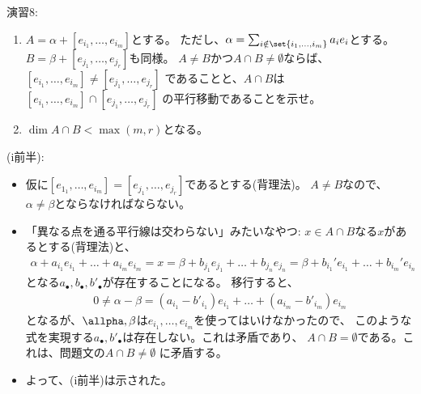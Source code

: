 \begin{framed}
  演習8:
  \begin{enumerate}[label=(\alph*)]
    \item $A=\alpha + [e_{i_1},\dots, e_{i_m}]$とする。
    ただし、$\alpha = \sum_{i\notin \set{i_1,\dots,i_m}}a_i e_i$とする。
    $B=\beta + [e_{j_1},\dots,e_{j_r}]$も同様。
    $A\neq B$かつ$A\cap B\neq \emptyset$ならば、
    $[e_{i_1},\dots,e_{i_m}]\neq [e_{j_1},\dots, e_{j_r}]$
    であることと、$A\cap B$は
    $[e_{i_1},\dots,e_{i_m}] \cap [e_{j_1},\dots,e_{j_r}]$
    の平行移動であることを示せ。
    \item
    $\dim A\cap B < \max(m,r)$となる。
  \end{enumerate}
\end{framed}
\begin{myproof}
  (i前半):
  \begin{itemize}
    \item
    仮に$[e_{1_1},\dots,e_{i_m}]= [e_{j_1},\dots, e_{j_r}]$であるとする(背理法)。
    $A\neq B$なので、$\alpha \neq \beta$とならなければならない。
    \item 「異なる点を通る平行線は交わらない」みたいなやつ:
    $x\in A\cap B$なる$x$があるとする(背理法)と、
    \begin{align}
    \alpha + a_{i_1}e_{i_1} + \dots + a_{i_m}e_{i_m} = x=
    \beta + b_{j_1}e_{j_1} + \dots + b_{j_n}e_{j_n}
    =
    \beta + b_{i_1}' e_{i_1} + \dots + b_{i_m}'e_{i_n}
    \end{align}
    となる$a_\bullet,b_\bullet,b'_\bullet$が存在することになる。
    移行すると、
    \begin{align}
        0\neq \alpha-\beta = (a_{i_1}-b'_{i_1})e_{i_1} + \dots + (a_{i_m}-b'_{i_m})e_{i_m}
    \end{align}
    となるが、$\allpha,\beta$は$e_{i_1},\dots,e_{i_m}$を使ってはいけなかったので、
    このような式を実現する$a_\bullet,b'_\bullet$は存在しない。これは矛盾であり、
    $A\cap B = \emptyset$である。これは、問題文の$A\cap B \neq \emptyset$
    に矛盾する。
    \item
    よって、(i前半)は示された。
  \end{itemize}


\end{myproof}
